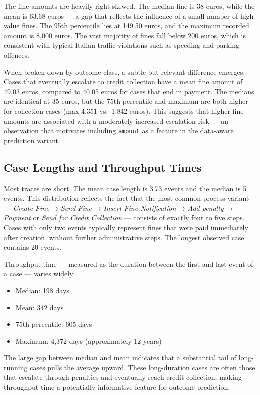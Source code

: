 The fine amounts are heavily right-skewed. The median fine is 38 euros, while the mean is 63.68 euros — a gap that reflects the influence of a small number of high-value fines. The 95th percentile lies at 149.50 euros, and the maximum recorded amount is 8,000 euros. The vast majority of fines fall below 200 euros, which is consistent with typical Italian traffic violations such as speeding and parking offences.

When broken down by outcome class, a subtle but relevant difference emerges. Cases that eventually escalate to credit collection have a mean fine amount of 49.03 euros, compared to 40.05 euros for cases that end in payment. The medians are identical at 35 euros, but the 75th percentile and maximum are both higher for collection cases (max 4,351 vs.\ 1,842 euros). This suggests that higher fine amounts are associated with a moderately increased escalation risk — an observation that motivates including \texttt{amount} as a feature in the data-aware prediction variant.

\subsection{Case Lengths and Throughput Times}

Most traces are short. The mean case length is 3.73 events and the median is 5 events. This distribution reflects the fact that the most common process variant — \textit{Create Fine} → \textit{Send Fine} → \textit{Insert Fine Notification} → \textit{Add penalty} → \textit{Payment} or \textit{Send for Credit Collection} — consists of exactly four to five steps. Cases with only two events typically represent fines that were paid immediately after creation, without further administrative steps. The longest observed case contains 20 events.

Throughput time — measured as the duration between the first and last event of a case — varies widely:

\begin{itemize}
    \item Median: 198 days
    \item Mean: 342 days
    \item 75th percentile: 605 days
    \item Maximum: 4,372 days (approximately 12 years)
\end{itemize}

The large gap between median and mean indicates that a substantial tail of long-running cases pulls the average upward. These long-duration cases are often those that escalate through penalties and eventually reach credit collection, making throughput time a potentially informative feature for outcome prediction.


